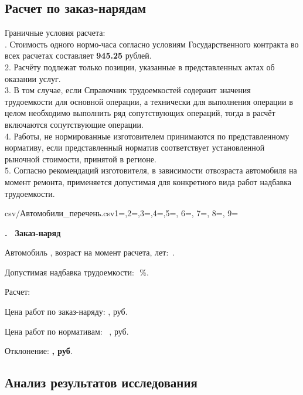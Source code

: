 \subsection{Расчет по заказ-нарядам}

Граничные условия расчета:\\
.  Стоимость одного нормо-часа согласно условиям Государственного контракта во всех расчетах  составляет \textbf{945.25} рублей.\\
2. Расчёту подлежат только позиции, указанные в представленных актах об оказании услуг.\\
3. В том случае, если Справочник трудоемкостей содержит значения трудоемкости для основной операции, а технически для выполнения операции в целом необходимо выполнить ряд сопутствующих операций, тогда в расчёт включаются сопутствующие операции.\\
4. Работы, не нормированные изготовителем принимаются по представленному нормативу, если представленный  норматив соответствует установленной рыночной стоимости, принятой в регионе.\\
5. Согласно рекомендаций изготовителя, в зависимости отвозраста автомобиля на момент ремонта, применяется допустимая для конкретного вида работ надбавка трудоемкости.

\parindent     



\csvreader[separator=semicolon, %
]
%
{csv/Автомобили_перечень.csv}{1=,2=,3=,4=,5=, 6=, 7=, 8=, 9=}%
{\begin{flushleft}\large\bfseries {}. \, Заказ-наряд   \end{flushleft}
	\large%
	Автомобиль , возраст  на момент расчета, лет:\,  .
	\par Допустимая надбавка трудоемкости:\, \,\%. 
	\par {Расчет:}
	\par Цена работ по заказ-наряду: , руб. 
	\par Цена работ по нормативам:\,\,\, , руб. 
	\par Отклонение:\hspace{34mm}  \textbf{, руб}.
\pagebreak
}%


\subsection{Анализ результатов исследования}

